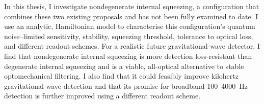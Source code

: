In this thesis, I investigate nondegenerate internal squeezing, a configuration that combines these two existing proposals and has not been fully examined to date.
I use an analytic, Hamiltonian model to characterise this configuration's quantum noise--limited sensitivity, stability, squeezing threshold, tolerance to optical loss, and different readout schemes. For a realistic future gravitational-wave detector, I find that nondegenerate internal squeezing is more detection loss-resistant than degenerate internal squeezing and is a viable, all-optical alternative to stable optomechanical filtering. I also find that it could feasibly improve kilohertz gravitational-wave detection and that its promise for broadband 100--4000~Hz detection is further improved using a different readout scheme.


